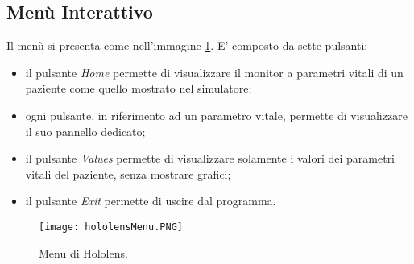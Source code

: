 \subsection{Menù Interattivo}
Il menù si presenta come nell'immagine \ref{pic:menu-hololens}. E' composto da sette pulsanti:
\begin{itemize}
    \item il pulsante \textit{Home} permette di visualizzare il monitor a parametri vitali di un paziente come quello mostrato nel simulatore;
    
    \item ogni pulsante, in riferimento ad un parametro vitale, permette di visualizzare il suo pannello dedicato;
    
    \item il pulsante \textit{Values} permette di visualizzare solamente i valori dei parametri vitali del paziente, senza mostrare grafici;
    
    \item il pulsante \textit{Exit} permette di uscire dal programma.
\end{itemize}

\begin{figure}[ht]
    \texttt{[image: hololensMenu.PNG]}
    \centering
    \caption{\label{pic:menu-hololens}Menu di Hololens.}
\end{figure}

